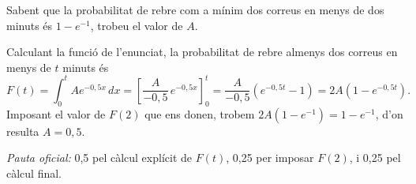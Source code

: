 \begin{apartats}
Sabent que la probabilitat de rebre com a mínim dos correus en menys de dos minuts és $1-e^{-1}$, trobeu el
valor de $A$.

\begin{solucio}
Calculant la funció de l'enunciat, la probabilitat de rebre almenys dos correus en menys de $t$ minuts és
\[
F(t)=\int_0^tAe^{-0{,}5x}\,dx=\left[\frac{A}{-0{,}5}\,e^{-0{,}5x}\right]_0^t=\frac{A}{-0{,}5}\left(e^{-0{,}5t}-1\right)
=2A\left(1-e^{-0{,}5t}\right).
\]
Imposant el valor de $F(2)$ que ens donen, trobem $2A\left(1-e^{-1}\right)=1-e^{-1}$, d'on resulta $A=0{,}5$.

\textit{Pauta oficial:} 0,5 pel càlcul explícit de $F(t)$, 0,25 per imposar $F(2)$, i 0,25 pel càlcul final.
\end{solucio}

\end{apartats}
